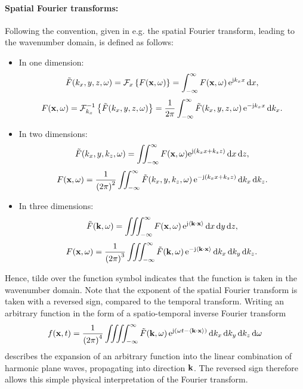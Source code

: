 \paragraph{Spatial Fourier transforms:} 
Following the convention, given in e.g. \cite{Ahrens2012} the spatial Fourier transform, leading to the wavenumber domain, is defined as follows:
\begin{itemize}
\item In one dimension:
\begin{equation}
\label{eq:spatial_fourier_transform_def}
\tilde{F}(k_x,y,z,\omega) = \FT[x]{F(\vx,\omega)} = \int_{-\infty}^{\infty} F(\vx,\omega) \, \te^{\ti k_x x} \, \td x,
\end{equation}
\begin{equation}
\label{eq:spatial_inverse_fourier_transform_def}
F(\vx,\omega) = \IFT[k_x]{\tilde{F}(k_x,y,z,\omega)} = \frac{1}{2\pi} \int_{-\infty}^{\infty} \tilde{F}(k_x,y,z,\omega) \, \te^{ -\ti k_x x} \, \td k_x.
\end{equation}
\item In two dimensions:
\begin{equation}
\label{eq:spatial_fourier_transform_def_2d}
\tilde{F}(k_x,y,k_z,\omega) = \iint_{-\infty}^{\infty} F(\vx,\omega) \te^{\ti \left( k_x x + k_z z \right) } \, \td x \, \td z,
\end{equation}
\begin{equation}
\label{eq:spatial_inverse_fourier_transform_def_2d}
F(\vx,\omega) = \frac{1}{\left( 2\pi \right)^2} \iint_ {-\infty}^{\infty} \tilde{F}(k_x,y,k_z,\omega) \, \te^{ -\ti \left( k_x x + k_z z \right)} \, \td k_x \, \td k_z.
\end{equation}
\item In three dimensions:
\begin{equation}
\label{eq:spatial_fourier_transform_def_3d}
\tilde{F}(\vk,\omega)= \iiint_ {-\infty}^{\infty} F(\vx,\omega) \, \te^{ \ti \left< \vk \cdot \vx \right>}\,  \td x \,\td y\,\td z,
\end{equation}
\begin{equation}
\label{eq:spatial_inverse_fourier_transform_def_3d}
F(\vx,\omega) = \frac{1}{\left( 2\pi \right)^3} \iiint_{-\infty}^{\infty} \tilde{F}(\vk,\omega) \, \te^{ -\ti \left< \vk \cdot \vx \right>} \, \td k_x \, \td k_y \, \td k_z.
\end{equation}
\end{itemize}
Hence, tilde over the function symbol indicates that the function is taken in the wavenumber domain.
Note that the exponent of the spatial Fourier transform is taken with a reversed sign, compared to the temporal transform.
Writing an arbitrary function in the form of a spatio-temporal inverse Fourier transform
\begin{equation}
f(\mathbf{x},t) = \frac{1}{\left( 2\pi \right)^4} \iiiint_{-\infty}^{\infty} \tilde{F}(\mathbf{k},\omega) \, \mathrm{e}^{ \mathrm{j} \left( \omega t - \left< \mathbf{k} \cdot \mathbf{x} \right> \right)} \, \mathrm{d} k_x \, \mathrm{d} k_y \, \mathrm{d} k_z \, \mathrm{d} \omega
\end{equation}
describes the expansion of an arbitrary function into the linear combination of harmonic plane waves, propagating into direction $\mathbf{k}$.
The reversed sign therefore allows this simple physical interpretation of the Fourier transform.


